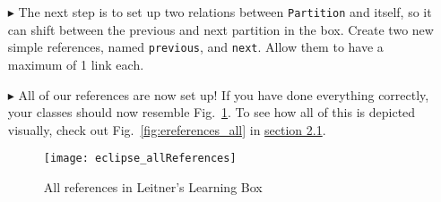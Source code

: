 \begin{itemize}
\item[$\blacktriangleright$] The next step is to set up two relations between \texttt{Partition} and itself, so it can shift between the previous and next
partition in the box. Create two new simple references, named \texttt{previous}, and \texttt{next}. Allow them to have a maximum of 1 link each.

\item[$\blacktriangleright$] All of our references are now set up! If you have done everything correctly, your classes should now resemble Fig.~\ref{fig:allReferences}.
To see how all of this is depicted visually, check out Fig.~\ref{fig:ereferences_all} in \hyperlink{sec:static vis}{section 2.1}.

\begin{figure}[htbp]
	\centering
  \texttt{[image: eclipse\_allReferences]}
	\caption{All references in Leitner's Learning Box}
	\label{fig:allReferences}
\end{figure} 

\end{itemize}
